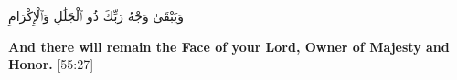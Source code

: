 \begin{center}
    \begin{RLtext}
        وَيَبْقَىٰ وَجْهُ رَبِّكَ ذُو ٱلْجَلَٰلِ وَٱلْإِكْرَامِ 
    \end{RLtext}
    \textbf{And there will remain the Face of your Lord, Owner of Majesty and Honor.} [55:27]
\end{center}

